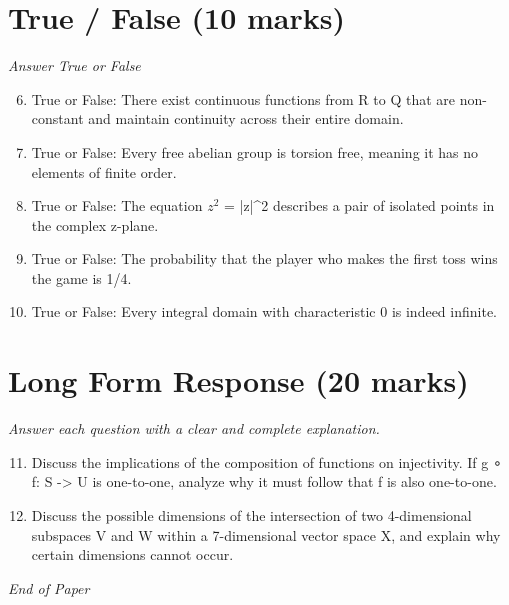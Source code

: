 \documentclass[12pt]{article}
\begin{document}
\section*{True / False (10 marks)}
\textit{Answer True or False}
\begin{enumerate}[label=\arabic*.]
\setcounter{enumi}{5}
\item True or False: There exist continuous functions from R to Q that are non-constant and maintain continuity across their entire domain.
\item True or False: Every free abelian group is torsion free, meaning it has no elements of finite order.
\item True or False: The equation $z^2$ = |z|^2 describes a pair of isolated points in the complex z-plane.
\item True or False: The probability that the player who makes the first toss wins the game is 1/4.
\item True or False: Every integral domain with characteristic 0 is indeed infinite.
\end{enumerate}

\section*{Long Form Response (20 marks)}
\textit{Answer each question with a clear and complete explanation.}
\begin{enumerate}[label=\arabic*.]
\setcounter{enumi}{10}
\item Discuss the implications of the composition of functions on injectivity. If g ∘ f: S -\textgreater{} U is one-to-one, analyze why it must follow that f is also one-to-one.
\item Discuss the possible dimensions of the intersection of two 4-dimensional subspaces V and W within a 7-dimensional vector space X, and explain why certain dimensions cannot occur.
\end{enumerate}

\vfill
\noindent\textit{End of Paper}
\end{document}
